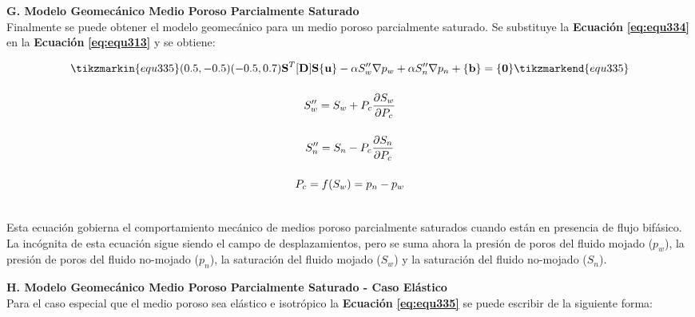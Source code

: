 \textbf{G. Modelo Geomecánico Medio Poroso Parcialmente Saturado}
\\
Finalmente se puede obtener el modelo geomecánico para un medio poroso parcialmente saturado. Se substituye la \textbf{Ecuación} \textbf{\ref{eq:equ334}} en la \textbf{Ecuación} \textbf{\ref{eq:equ313}} y se obtiene:\bigskip


\begin{ceqn} 
\begin{subequations} \label{eq:equ335} 
\begin{gather}
\tikzmarkin{equ335}(0.5,-0.5)(-0.5,0.7)
\normalsize{\mathbf{S}^T[\mathbf{D}]\mathbf{S}\{\mathbf{u}\} - 
\alpha S''_w\nabla p_w + \alpha S''_n\nabla p_n + \{\mathbf{b}\} = \{\mathbf{0}\}}
\tikzmarkend{equ335}\label{eq:equ335a} \\[12pt]
S''_w = S_w + P_c\frac{\partial S_w}{\partial P_c}  \label{eq:equ335b} \\[12pt]
S''_n = S_n - P_c\frac{\partial S_n}{\partial P_c}  \label{eq:equ335c} \\[12pt]
P_c = \mathnormal{f}(S_w) = p_n - p_w  \label{eq:equ335d}
\end{gather}
\end{subequations} 
\end{ceqn}
\\
Esta ecuación gobierna el comportamiento mecánico de medios poroso parcialmente saturados cuando están en presencia de flujo bifásico. La incógnita de esta ecuación sigue siendo el campo de desplazamientos, pero se suma ahora la presión de poros del fluido mojado ($p_w$), la presión de poros del fluido no-mojado ($p_n$), la saturación del fluido mojado ($S_w$) y la saturación del fluido no-mojado ($S_n$).\bigskip\bigskip 

\textbf{H. Modelo Geomecánico Medio Poroso Parcialmente Saturado - Caso Elástico}
\\
Para el caso especial que el medio poroso sea elástico e isotrópico la \textbf{Ecuación} \textbf{\ref{eq:equ335}} se puede escribir de la siguiente forma:


